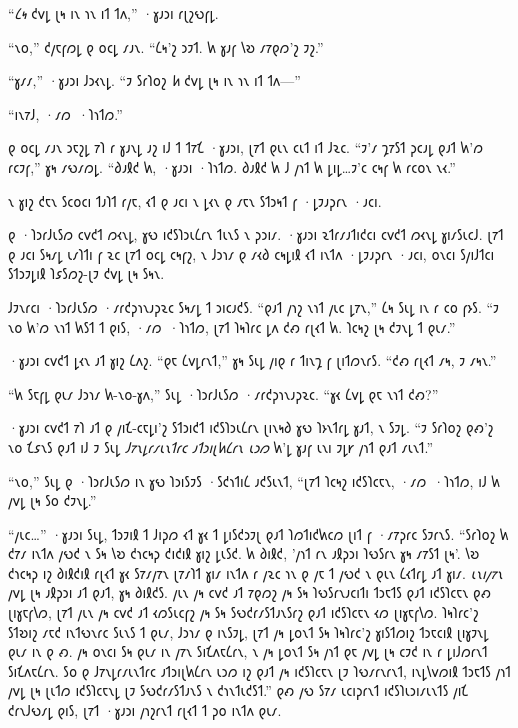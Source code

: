 “\emph{𐑖𐑰} 𐑒𐑫𐑛 𐑚𐑰 𐑦𐑯 𐑪𐑯 𐑦𐑑 𐑑𐑵,” ·𐑣𐑨𐑮𐑦 𐑩𐑚𐑟𐑻𐑝𐑛.

“𐑯𐑴,” 𐑒𐑢𐑱𐑝𐑼𐑛 𐑞 𐑴𐑤𐑛 𐑥𐑨𐑯. “𐑖𐑰'𐑟 𐑮𐑲𐑑. 𐑿 𐑣𐑨𐑝 𐑘𐑹 𐑥𐑳𐑞𐑼'𐑟 𐑲𐑟.”

“𐑣𐑥𐑥,” ·𐑣𐑨𐑮𐑦 𐑓𐑮𐑬𐑯𐑛. “𐑲 𐑕𐑩𐑐𐑴𐑟 \emph{𐑿} 𐑒𐑫𐑛 𐑚𐑰 𐑦𐑯 𐑪𐑯 𐑦𐑑 𐑑𐑵—”

“𐑦𐑯𐑳𐑓, ·𐑥𐑼~·𐑐𐑪𐑑𐑼.”

𐑞 𐑴𐑤𐑛 𐑥𐑨𐑯 𐑮𐑱𐑟𐑛 𐑳𐑐 𐑩 𐑣𐑨𐑯𐑛 𐑨𐑟 𐑦𐑓 𐑑 𐑑𐑳𐑗 ·𐑣𐑨𐑮𐑦, 𐑚𐑳𐑑 𐑞𐑧𐑯 𐑤𐑧𐑑 𐑦𐑑 𐑓𐑷𐑤. “𐑲'𐑥 𐑡𐑳𐑕𐑑 𐑜𐑤𐑨𐑛 𐑞𐑨𐑑 𐑿'𐑼 𐑩𐑤𐑲𐑝,” 𐑣𐑰 𐑥𐑻𐑥𐑼𐑛. “𐑔𐑨𐑙𐑒 𐑿, ·𐑣𐑨𐑮𐑦 ·𐑐𐑪𐑑𐑼. 𐑔𐑨𐑙𐑒 𐑿 𐑓 𐑢𐑪𐑑 𐑿 𐑛𐑦𐑛…𐑲'𐑤 𐑤𐑰𐑝 𐑿 𐑩𐑤𐑴𐑯 𐑯𐑬.”

𐑯 𐑣𐑦𐑟 𐑒𐑱𐑯 𐑕𐑤𐑴𐑤𐑦 𐑑𐑨𐑐𐑑 𐑩𐑢𐑱, 𐑬𐑑 𐑞 𐑨𐑤𐑦 𐑯 𐑛𐑬𐑯 𐑞 𐑥𐑱𐑯 𐑕𐑑𐑮𐑰𐑑 𐑝 ·𐑛𐑲𐑨𐑜𐑩𐑯 ·𐑨𐑤𐑦.

𐑞 ·𐑐𐑮𐑩𐑓𐑧𐑕𐑼 𐑤𐑫𐑒𐑑 𐑼𐑬𐑯𐑛, 𐑣𐑻 𐑦𐑒𐑕𐑐𐑮𐑧𐑖𐑩𐑯 𐑑𐑧𐑯𐑕 𐑯 𐑜𐑮𐑦𐑥. ·𐑣𐑨𐑮𐑦 𐑷𐑑𐑩𐑥𐑨𐑑𐑦𐑒𐑤𐑦 𐑤𐑫𐑒𐑑 𐑼𐑬𐑯𐑛 𐑣𐑦𐑥𐑕𐑧𐑤𐑓. 𐑚𐑳𐑑 𐑞 𐑨𐑤𐑦 𐑕𐑰𐑥𐑛 𐑧𐑥𐑐𐑑𐑦 𐑝 𐑷𐑤 𐑚𐑳𐑑 𐑴𐑤𐑛 𐑤𐑰𐑝𐑟, 𐑯 𐑓𐑮𐑪𐑥 𐑞 𐑥𐑬𐑔 𐑤𐑰𐑛𐑦𐑙 𐑬𐑑 𐑦𐑯𐑑𐑵 ·𐑛𐑲𐑨𐑜𐑩𐑯 ·𐑨𐑤𐑦, 𐑴𐑯𐑤𐑦 𐑕𐑢𐑦𐑓𐑑𐑤𐑦 𐑕𐑑𐑮𐑲𐑛𐑦𐑙 𐑐𐑭𐑕𐑼𐑟-𐑚𐑲 𐑒𐑫𐑛 𐑚𐑰 𐑕𐑰𐑯.

𐑓𐑲𐑯𐑩𐑤𐑦 ·𐑐𐑮𐑩𐑓𐑧𐑕𐑼 ·𐑥𐑩𐑒𐑜𐑪𐑯𐑨𐑜𐑷𐑤 𐑕𐑰𐑥𐑛 𐑑 𐑮𐑦𐑤𐑨𐑒𐑕. “𐑞𐑨𐑑 𐑢𐑪𐑟 𐑯𐑪𐑑 𐑢𐑧𐑤 𐑛𐑳𐑯,” 𐑖𐑰 𐑕𐑧𐑛 𐑦𐑯 𐑩 𐑤𐑴 𐑝𐑶𐑕. “𐑲 𐑯𐑴 𐑿'𐑼 𐑯𐑪𐑑 𐑿𐑕𐑑 𐑑 𐑞𐑦𐑕, ·𐑥𐑼~·𐑐𐑪𐑑𐑼, 𐑚𐑳𐑑 𐑐𐑰𐑐𐑩𐑤 𐑛𐑵 𐑒𐑺 𐑩𐑚𐑬𐑑 𐑿. 𐑐𐑤𐑰𐑟 𐑚𐑰 𐑒𐑲𐑯𐑛 𐑑 𐑞𐑧𐑥.”

·𐑣𐑨𐑮𐑦 𐑤𐑫𐑒𐑑 𐑛𐑬𐑯 𐑨𐑑 𐑣𐑦𐑟 𐑖𐑵𐑟. “𐑞𐑱 𐑖𐑫𐑛𐑩𐑯𐑑,” 𐑣𐑰 𐑕𐑧𐑛 𐑢𐑦𐑞 𐑩 𐑑𐑦𐑯𐑡 𐑝 𐑚𐑦𐑑𐑼𐑯𐑩𐑕. “𐑒𐑺 𐑩𐑚𐑬𐑑 𐑥𐑰, 𐑲 𐑥𐑰𐑯.”

“𐑿 𐑕𐑱𐑝𐑛 𐑞𐑧𐑥 𐑓𐑮𐑪𐑥 𐑿-𐑯𐑴-𐑣𐑵,” 𐑕𐑧𐑛 ·𐑐𐑮𐑩𐑓𐑧𐑕𐑼 ·𐑥𐑩𐑒𐑜𐑪𐑯𐑨𐑜𐑷𐑤. “𐑣𐑬 𐑖𐑫𐑛 𐑞𐑱 𐑯𐑪𐑑 𐑒𐑺?”

·𐑣𐑨𐑮𐑦 𐑤𐑫𐑒𐑑 𐑳𐑐 𐑨𐑑 𐑞 𐑢𐑦𐑗-𐑤𐑱𐑛𐑦'𐑟 𐑕𐑑𐑮𐑦𐑒𐑑 𐑦𐑒𐑕𐑐𐑮𐑧𐑖𐑩𐑯 𐑚𐑦𐑯𐑰𐑔 𐑣𐑻 𐑐𐑶𐑯𐑑𐑩𐑛 𐑣𐑨𐑑, 𐑯 𐑕𐑲𐑛. “𐑲 𐑕𐑩𐑐𐑴𐑟 𐑞𐑺'𐑟 𐑯𐑴 𐑗𐑭𐑯𐑕 𐑞𐑨𐑑 𐑦𐑓 𐑲 𐑕𐑧𐑛 \emph{𐑓𐑳𐑯𐑛𐑩𐑥𐑧𐑯𐑑𐑩𐑤 𐑨𐑑𐑮𐑦𐑚𐑿𐑖𐑩𐑯 𐑧𐑮𐑼} 𐑿'𐑛 𐑣𐑨𐑝 𐑧𐑯𐑦 𐑲𐑛𐑾 𐑢𐑪𐑑 𐑞𐑨𐑑 𐑥𐑧𐑯𐑑.”

“𐑯𐑴,” 𐑕𐑧𐑛 𐑞 ·𐑐𐑮𐑩𐑓𐑧𐑕𐑼 𐑦𐑯 𐑣𐑻 𐑐𐑮𐑦𐑕𐑲𐑕 ·𐑕𐑒𐑪𐑑𐑦𐑖 𐑨𐑒𐑕𐑧𐑯𐑑, “𐑚𐑳𐑑 𐑐𐑤𐑰𐑟 𐑦𐑒𐑕𐑐𐑤𐑱𐑯, ·𐑥𐑼~·𐑐𐑪𐑑𐑼, 𐑦𐑓 𐑿 𐑢𐑫𐑛 𐑚𐑰 𐑕𐑴 𐑒𐑲𐑯𐑛.”

“𐑢𐑧𐑤…” ·𐑣𐑨𐑮𐑦 𐑕𐑧𐑛, 𐑑𐑮𐑲𐑦𐑙 𐑑 𐑓𐑦𐑜𐑼 𐑬𐑑 𐑣𐑬 𐑑 𐑛𐑦𐑕𐑒𐑮𐑲𐑚 𐑞𐑨𐑑 𐑐𐑼𐑑𐑦𐑒𐑿𐑤𐑼 𐑚𐑦𐑑 𐑝 ·𐑥𐑳𐑜𐑩𐑤 𐑕𐑲𐑩𐑯𐑕. “𐑕𐑩𐑐𐑴𐑟 𐑿 𐑒𐑳𐑥 𐑦𐑯𐑑𐑵 𐑢𐑻𐑒 𐑯 𐑕𐑰 𐑘𐑹 𐑒𐑪𐑤𐑰𐑜 𐑒𐑦𐑒𐑦𐑙 𐑣𐑦𐑟 𐑛𐑧𐑕𐑒. 𐑿 𐑔𐑦𐑙𐑒, '𐑢𐑪𐑑 𐑩𐑯 𐑨𐑙𐑜𐑮𐑦 𐑐𐑻𐑕𐑩𐑯 𐑣𐑰 𐑥𐑳𐑕𐑑 𐑚𐑰'. 𐑘𐑹 𐑒𐑪𐑤𐑰𐑜 𐑦𐑟 𐑔𐑦𐑙𐑒𐑦𐑙 𐑩𐑚𐑬𐑑 𐑣𐑬 𐑕𐑳𐑥𐑢𐑳𐑯 𐑚𐑳𐑥𐑐𐑑 𐑣𐑦𐑥 𐑦𐑯𐑑𐑵 𐑩 𐑢𐑷𐑤 𐑪𐑯 𐑞 𐑢𐑱 𐑑 𐑢𐑻𐑒 𐑯 𐑞𐑧𐑯 𐑖𐑬𐑑𐑩𐑛 𐑨𐑑 𐑣𐑦𐑥. \emph{𐑧𐑯𐑦𐑢𐑳𐑯} 𐑢𐑫𐑛 𐑚𐑰 𐑨𐑙𐑜𐑮𐑦 𐑨𐑑 𐑞𐑨𐑑, 𐑣𐑰 𐑔𐑦𐑙𐑒𐑕. 𐑢𐑧𐑯 𐑢𐑰 𐑤𐑫𐑒 𐑨𐑑 𐑳𐑞𐑼𐑟 𐑢𐑰 𐑕𐑰 𐑐𐑻𐑕𐑩𐑯𐑨𐑤𐑦𐑑𐑦 𐑑𐑮𐑱𐑑𐑕 𐑞𐑨𐑑 𐑦𐑒𐑕𐑐𐑤𐑱𐑯 𐑞𐑺 𐑚𐑦𐑣𐑱𐑝𐑘𐑼, 𐑚𐑳𐑑 𐑢𐑧𐑯 𐑢𐑰 𐑤𐑫𐑒 𐑨𐑑 𐑬𐑼𐑕𐑧𐑤𐑝𐑟 𐑢𐑰 𐑕𐑰 𐑕𐑻𐑒𐑩𐑥𐑕𐑑𐑨𐑯𐑕𐑩𐑟 𐑞𐑨𐑑 𐑦𐑒𐑕𐑐𐑤𐑱𐑯 𐑬𐑼 𐑚𐑦𐑣𐑱𐑝𐑘𐑼. 𐑐𐑰𐑐𐑩𐑤'𐑟 𐑕𐑑𐑹𐑦𐑟 𐑥𐑱𐑒 𐑦𐑯𐑑𐑻𐑯𐑩𐑤 𐑕𐑧𐑯𐑕 𐑑 𐑞𐑧𐑥, 𐑓𐑮𐑪𐑥 𐑞 𐑦𐑯𐑕𐑲𐑛, 𐑚𐑳𐑑 𐑢𐑰 𐑛𐑴𐑯𐑑 𐑕𐑰 𐑐𐑰𐑐𐑩𐑤'𐑟 𐑣𐑦𐑕𐑑𐑼𐑦𐑟 𐑑𐑮𐑱𐑤𐑦𐑙 𐑚𐑦𐑣𐑲𐑯𐑛 𐑞𐑧𐑥 𐑦𐑯 𐑞 𐑺. 𐑢𐑰 𐑴𐑯𐑤𐑦 𐑕𐑰 𐑞𐑧𐑥 𐑦𐑯 𐑢𐑳𐑯 𐑕𐑦𐑗𐑵𐑱𐑖𐑩𐑯, 𐑯 𐑢𐑰 𐑛𐑴𐑯𐑑 𐑕𐑰 𐑢𐑪𐑑 𐑞𐑱 𐑢𐑫𐑛 𐑚𐑰 𐑤𐑲𐑒 𐑦𐑯 𐑩 𐑛𐑦𐑓𐑼𐑩𐑯𐑑 𐑕𐑦𐑗𐑵𐑱𐑖𐑩𐑯. 𐑕𐑴 𐑞 𐑓𐑳𐑯𐑛𐑩𐑥𐑧𐑯𐑑𐑩𐑤 𐑨𐑑𐑮𐑦𐑚𐑿𐑖𐑩𐑯 𐑧𐑮𐑼 𐑦𐑟 𐑞𐑨𐑑 𐑢𐑰 𐑦𐑒𐑕𐑐𐑤𐑱𐑯 𐑚𐑲 𐑐𐑻𐑥𐑩𐑯𐑩𐑯𐑑, 𐑦𐑯𐑛𐑘𐑫𐑼𐑦𐑙 𐑑𐑮𐑱𐑑𐑕 𐑢𐑪𐑑 𐑢𐑫𐑛 𐑚𐑰 𐑚𐑧𐑑𐑼 𐑦𐑒𐑕𐑐𐑤𐑱𐑯𐑛 𐑚𐑲 𐑕𐑻𐑒𐑩𐑥𐑕𐑑𐑨𐑯𐑕 𐑯 𐑒𐑪𐑯𐑑𐑧𐑒𐑕𐑑.” 𐑞𐑺 𐑢𐑻 𐑕𐑳𐑥 𐑧𐑤𐑦𐑜𐑩𐑯𐑑 𐑦𐑒𐑕𐑐𐑧𐑮𐑦𐑥𐑧𐑯𐑑𐑕 𐑢𐑦𐑗 𐑒𐑩𐑯𐑓𐑻𐑥𐑛 𐑞𐑦𐑕, 𐑚𐑳𐑑 ·𐑣𐑨𐑮𐑦 𐑢𐑪𐑟𐑩𐑯𐑑 𐑩𐑚𐑬𐑑 𐑑 𐑜𐑴 𐑦𐑯𐑑𐑵 𐑞𐑧𐑥.

